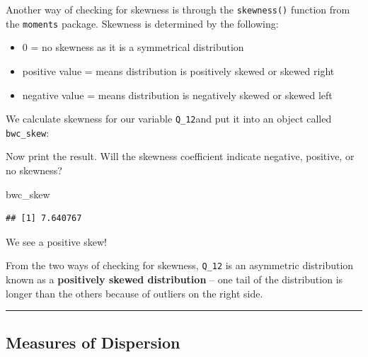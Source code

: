 \documentclass[
]{book}
\newenvironment{Shaded}{\begin{snugshade}}{\end{snugshade}}
\newcommand{\AttributeTok}[1]{\textcolor[rgb]{0.77,0.63,0.00}{#1}}
\newcommand{\ConstantTok}[1]{\textcolor[rgb]{0.00,0.00,0.00}{#1}}
\newcommand{\FunctionTok}[1]{\textcolor[rgb]{0.00,0.00,0.00}{#1}}
\newcommand{\NormalTok}[1]{#1}
\newcommand{\OtherTok}[1]{\textcolor[rgb]{0.56,0.35,0.01}{#1}}
\newcommand{\SpecialCharTok}[1]{\textcolor[rgb]{0.00,0.00,0.00}{#1}}
\providecommand{\tightlist}{%
  \setlength{\itemsep}{0pt}\setlength{\parskip}{0pt}}
\begin{document}
Another way of checking for skewness is through the \texttt{skewness()} function from the \texttt{moments} package. Skewness is determined by the following:

\begin{itemize}
\tightlist
\item
  0 = no skewness as it is a symmetrical distribution
\item
  positive value = means distribution is positively skewed or skewed right
\item
  negative value = means distribution is negatively skewed or skewed left
\end{itemize}

We calculate skewness for our variable \texttt{Q\_12}and put it into an object called \texttt{bwc\_skew}:

\begin{Shaded}
\end{Shaded}

Now print the result. Will the skewness coefficient indicate negative, positive, or no skewness?

\begin{Shaded}
\begin{Highlighting}[]
\NormalTok{bwc\_skew}
\end{Highlighting}
\end{Shaded}

\begin{verbatim}
## [1] 7.640767
\end{verbatim}

We see a positive skew!

From the two ways of checking for skewness, \texttt{Q\_12} is an asymmetric distribution known as a \textbf{positively skewed distribution} -- one tail of the distribution is longer than the others because of outliers on the right side.

\begin{center}\rule{0.5\linewidth}{0.5pt}\end{center}

\hypertarget{measures-of-dispersion}{%
\subsection{Measures of Dispersion}\label{measures-of-dispersion}}
\end{document}
